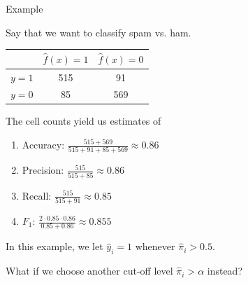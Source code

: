 \documentclass[10pt]{beamer}
\begin{document}
\begin{frame}{Example}

Say that we want to classify spam vs. ham. \\[3mm]\pause

\begin{center}
\begin{tabular}{ l | c | c }
  & $\hat{f}(x)=1$ & $\hat{f}(x)=0$\\
  \hline
  $y=1$ & 515 & 91 \\
  $y=0$ & 85 & 569 \\
  \hline
\end{tabular}
\end{center}
The cell counts yield us estimates of
\begin{enumerate}
\item Accuracy: $\frac{515+569}{515+91+85+569}\approx 0.86$
\item Precision: $\frac{515}{515+85}\approx 0.86$
\item Recall: $\frac{515}{515+91}\approx 0.85$
\item $F_1$: $\frac{2 \cdot 0.85 \cdot 0.86}{0.85 + 0.86}\approx 0.855$
\end{enumerate}

\pause

In this example, we let $\hat{y}_i=1$ whenever $\hat{\pi}_i>0.5$.

What if we choose another cut-off level $\hat{\pi}_i>\alpha$ instead?

\end{frame}
\end{document}
